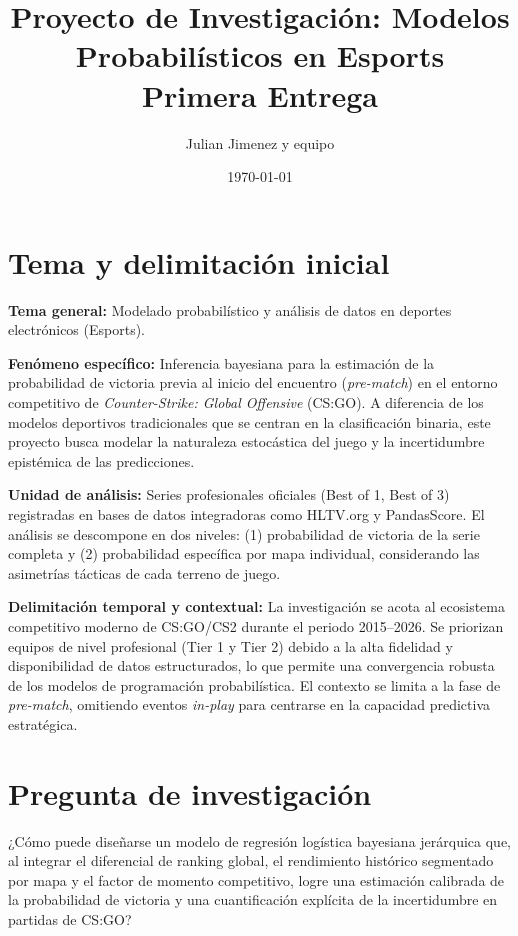\documentclass[12pt,a4paper]{article}
\title{\textbf{Proyecto de Investigación: Modelos Probabilísticos en Esports}\\ \Large Primera Entrega}
\author{Julian Jimenez y equipo}
\date{\today}
\begin{document}
\maketitle

\section{Tema y delimitación inicial}

\textbf{Tema general:} Modelado probabilístico y análisis de datos en deportes electrónicos (Esports).

\textbf{Fenómeno específico:} Inferencia bayesiana para la estimación de la probabilidad de victoria previa al inicio del encuentro (\textit{pre-match}) en el entorno competitivo de \textit{Counter-Strike: Global Offensive} (CS:GO). A diferencia de los modelos deportivos tradicionales que se centran en la clasificación binaria, este proyecto busca modelar la naturaleza estocástica del juego y la incertidumbre epistémica de las predicciones.

\textbf{Unidad de análisis:} Series profesionales oficiales (Best of 1, Best of 3) registradas en bases de datos integradoras como HLTV.org y PandasScore. El análisis se descompone en dos niveles: (1) probabilidad de victoria de la serie completa y (2) probabilidad específica por mapa individual, considerando las asimetrías tácticas de cada terreno de juego.

\textbf{Delimitación temporal y contextual:} La investigación se acota al ecosistema competitivo moderno de CS:GO/CS2 durante el periodo 2015--2026. Se priorizan equipos de nivel profesional (Tier 1 y Tier 2) debido a la alta fidelidad y disponibilidad de datos estructurados, lo que permite una convergencia robusta de los modelos de programación probabilística. El contexto se limita a la fase de \textit{pre-match}, omitiendo eventos \textit{in-play} para centrarse en la capacidad predictiva estratégica.

\section{Pregunta de investigación}

¿Cómo puede diseñarse un modelo de regresión logística bayesiana jerárquica que, al integrar el diferencial de ranking global, el rendimiento histórico segmentado por mapa y el factor de momento competitivo, logre una estimación calibrada de la probabilidad de victoria y una cuantificación explícita de la incertidumbre en partidas de CS:GO?
\end{document}
